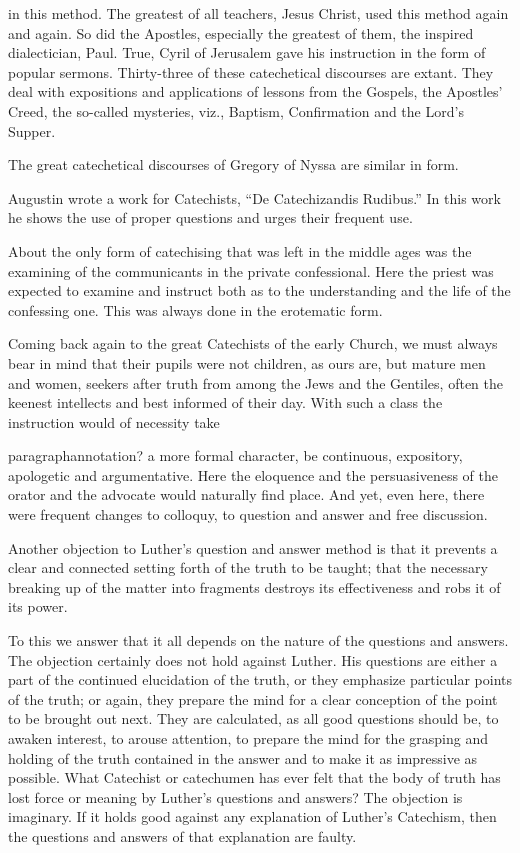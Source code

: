 in this method. The greatest of all teachers, Jesus Christ, used this method again and again. So did the Apostles, especially the greatest of them, the inspired dialectician, Paul. True, Cyril of Jerusalem gave his instruction in the form of popular sermons. Thirty-three of these catechetical discourses are extant. They deal with expositions and applications of lessons from the Gospels, the Apostles’ Creed, the so-called mysteries, viz., Baptism, Confirmation and the Lord’s Supper.

The great catechetical discourses of Gregory of Nyssa are similar in form.

Augustin wrote a work for Catechists, “De Catechizandis Rudibus.” In this work he shows the use of proper questions and urges their frequent use.

About the only form of catechising that was left in the middle ages was the examining of the communicants in the private confessional. Here the priest was expected to examine and instruct both as to the understanding and the life of the confessing one. This was always done in the erotematic form.

 Coming back again to the great Catechists of the early Church, we must always bear in mind that their pupils were not children, as ours are, but mature men and women, seekers after truth from among the Jews and the Gentiles, often the keenest intellects and best informed of their day. With such a class the instruction would of necessity take

paragraphannotation?
a more formal character, be continuous, expository, apologetic and argumentative. Here the eloquence and the persuasiveness of the orator and the advocate would naturally find place. And yet, even here, there were frequent changes to colloquy, to question and answer and free discussion.

Another objection to Luther’s question and answer method is that it prevents a clear and connected setting forth of the truth to be taught; that the necessary breaking up of the matter into fragments destroys its effectiveness and robs it of its power.

To this we answer that it all depends on the nature of the questions and answers.  The objection certainly does not hold against Luther. His questions are either a part of the continued elucidation of the truth, or they emphasize particular points of the truth; or again, they prepare the mind for a clear conception of the point to be brought out next. They are calculated, as all good questions should be, to awaken interest, to arouse attention, to prepare the mind for the grasping and holding of the truth contained in the answer and to make it as impressive as possible. What Catechist or catechumen has ever felt that the body of truth has lost force or meaning by Luther’s questions and answers? The objection is imaginary. If it holds good against any explanation of Luther’s Catechism,
then the questions and answers of that explanation are faulty.

